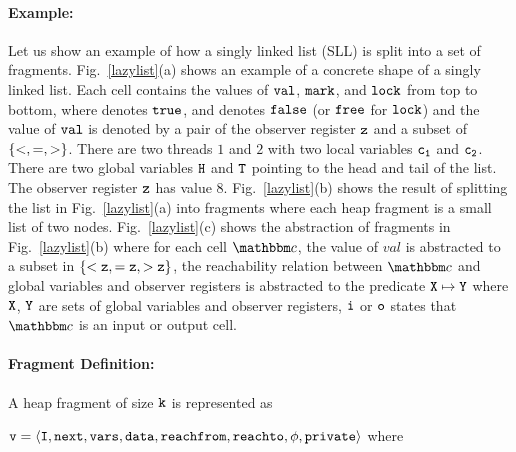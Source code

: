 \paragraph{Example:} Let us show an example of how a singly linked list (SLL) is split into a set of fragments. Fig.~\ref{lazylist}(a) shows an example of a concrete shape of a singly linked list. Each cell contains the values of $\tt val$, $\tt mark$, and $\tt lock$ from top to bottom, where \tick \; denotes $\tt true$, and \cross \; denotes $\tt false$ (or $\tt free$ for $\tt lock$) and the value of $\tt val$ is denoted by a pair of the observer register $\tt z$ and a subset of $\left\{<, =, >\right\}$. There are two threads $1$ and $2$ with two local variables $\tt c_1$ and $\tt c_2$. There are two global variables $\tt H$ and $\tt T$ pointing to the head and tail of the list. The observer register $\tt z$ has value 8. Fig.~\ref{lazylist}(b) shows the result of splitting the list in Fig.~\ref{lazylist}(a) into fragments where each heap fragment is a small list of two nodes. Fig.~\ref{lazylist}(c) shows the abstraction of fragments in Fig.~\ref{lazylist}(b) where for each cell $\cell$, the value of $val$ is abstracted to a subset in $\tt \{<z, =z, >z\}$, the reachability relation between $\cell$ and global variables and observer registers is abstracted to the predicate $\tt X \mapsto \tt Y$ where $\tt X$, $\tt Y$ are sets of global variables and observer registers, $\tt i$ or $\tt o$ states that $\cell$ is an input or output cell.

\paragraph{Fragment Definition:} A heap fragment of size $\tt k$ is represented as \begin{center}
	${\tt v} = \left\langle\tt I,\tt next, {\tt vars}, {\tt data}, {\tt reachfrom}, {\tt reachto} ,\phi, \tt private\right\rangle$ where 
\end{center} 

